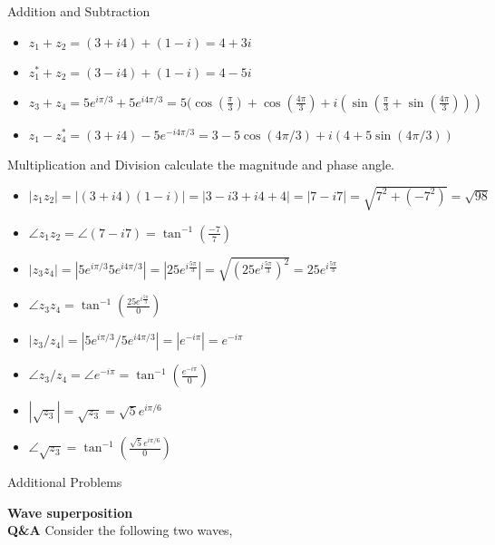 \documentclass[main.tex]{subfiles}
\begin{document}
 Addition and Subtraction
 \begin{itemize}
  \item $z_1 + z_2 = (3 + i4) + (1-i) = 4+3i$
  \item $z_1^* + z_2 = (3 - i4) + (1-i) = 4-5i$
  \item $z_3 + z_4 = 5e^{i\pi /3} + 5e^{i4\pi/3} = 5(\cos(\frac{\pi}{3}) + \cos(\frac{4\pi}{3}) + i(\sin(\frac{\pi}{3} + \sin(\frac{4\pi}{3}))) $
  \item $z_1 - z_4^* = (3 + i4) - 5e^{-i4\pi/3} = 3 - 5\cos(4\pi/3) + i(4+5\sin(4\pi /3)) $
 \end{itemize}
 
 Multiplication and Division calculate the magnitude and phase angle.

\begin{itemize}
  \item $|z_1 z_2|= |(3 + i4)(1-i)| = |3 - i3 + i4 + 4| = |7 - i7| = \sqrt{7^2 + (-7^2)} = \sqrt{98}$ 
  \item $\angle z_1 z_2 = \angle(7-i7) = \tan^{-1}(\frac{-7}{7})$
  \item$|z_3 z_4| = |5e^{i\pi /3} 5e^{i4\pi/3}| = |25e^{i\frac{5\pi}{3}}| = \sqrt{(25e^{i\frac{5\pi}{3}})^2} = 25e^{i\frac{5\pi}{3}}$
  \item$\angle z_3 z_4 = \tan^{-1}(\frac{25e^{i\frac{5\pi}{3}}}{0})$
  \item $|z_3 / z_4| = |5e^{i\pi /3} / 5e^{i4\pi/3}| = |e^{-i\pi}| = e^{-i\pi} $
  \item $\angle z_3 / z_4 = \angle e^{-i\pi} = \tan^{-1}(\frac{e^{-i\pi}}{0})$
  \item $|\sqrt{z_3}| = \sqrt{z_3} = \sqrt{5}e^{i\pi /6} $
  \item $\angle\sqrt{z_3} = \tan^{-1}(\frac{\sqrt{5}e^{i\pi /6}}{0})$
 \end{itemize}

Additional Problems
 \begin{itemize}
  \item $z_1 + e^{i \pi} = 3 + i4 + \cos(\pi) + i\sin(\pi) = 2 + i4 $
  \item $e^{i \pi / 2}z_2 = e^{i \pi / 2}(1-i) = (\cos(\pi/2) + i\sin(\pi/2))(1-i)=i(1-i)=i+1$
  \item $e^{i\pi}z_3 = e^{i\pi}5e^{i\pi /3} = 5e^{i\pi \frac{4}{3}}$ 
  \item $\sqrt{e^{-i\pi}z_4} = e^{-i\pi/2}z_4}5e^{i4\pi/6} = 5e^{i\pi 1/6}$
\end{itemize}

\textbf{Wave superposition}\\
\textbf{Q\&A} Consider the following two waves,
\end{document}
